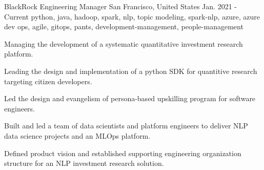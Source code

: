 \cventry
    {BlackRock} %
    {Engineering Manager} %
    {San Francisco, United States} %
    {Jan. 2021 - Current} %
    { python, java, hadoop, spark, nlp, topic modeling, spark-nlp, azure, azure dev ops, agile, gitops, pants, development-management, people-management} %
    {
    \begin{cvitems} %
       \item { Managing the development of a systematic quantitative investment research platform. }
       \item { Leading the design and implementation of a python SDK for quantitive research targeting citizen developers. }
       \item { Led the design and evangelism of persona-based upskilling program for software engineers. }
       \item { Built and led a team of data scientists and platform engineers to deliver NLP data science projects and an MLOps platform. }
       \item { Defined product vision and established supporting engineering organization structure for an NLP investment research solution. }
    \end{cvitems}
    }
